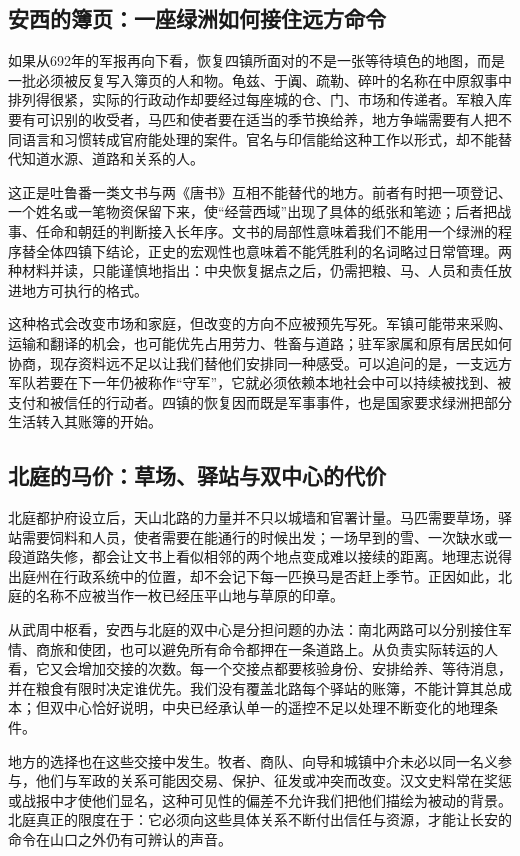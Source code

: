 \subsection{安西的簿页：一座绿洲如何接住远方命令}
如果从692年的军报再向下看，恢复四镇所面对的不是一张等待填色的地图，而是一批必须被反复写入簿页的人和物。龟兹、于阗、疏勒、碎叶的名称在中原叙事中排列得很紧，实际的行政动作却要经过每座城的仓、门、市场和传递者。军粮入库要有可识别的收受者，马匹和使者要在适当的季节换给养，地方争端需要有人把不同语言和习惯转成官府能处理的案件。官名与印信能给这种工作以形式，却不能替代知道水源、道路和关系的人。

这正是吐鲁番一类文书与两《唐书》互相不能替代的地方。前者有时把一项登记、一个姓名或一笔物资保留下来，使“经营西域”出现了具体的纸张和笔迹；后者把战事、任命和朝廷的判断接入长年序。文书的局部性意味着我们不能用一个绿洲的程序替全体四镇下结论，正史的宏观性也意味着不能凭胜利的名词略过日常管理。两种材料并读，只能谨慎地指出：中央恢复据点之后，仍需把粮、马、人员和责任放进地方可执行的格式。

这种格式会改变市场和家庭，但改变的方向不应被预先写死。军镇可能带来采购、运输和翻译的机会，也可能优先占用劳力、牲畜与道路；驻军家属和原有居民如何协商，现存资料远不足以让我们替他们安排同一种感受。可以追问的是，一支远方军队若要在下一年仍被称作“守军”，它就必须依赖本地社会中可以持续被找到、被支付和被信任的行动者。四镇的恢复因而既是军事事件，也是国家要求绿洲把部分生活转入其账簿的开始。

\subsection{北庭的马价：草场、驿站与双中心的代价}
北庭都护府设立后，天山北路的力量并不只以城墙和官署计量。马匹需要草场，驿站需要饲料和人员，使者需要在能通行的时候出发；一场早到的雪、一次缺水或一段道路失修，都会让文书上看似相邻的两个地点变成难以接续的距离。地理志说得出庭州在行政系统中的位置，却不会记下每一匹换马是否赶上季节。正因如此，北庭的名称不应被当作一枚已经压平山地与草原的印章。

从武周中枢看，安西与北庭的双中心是分担问题的办法：南北两路可以分别接住军情、商旅和使团，也可以避免所有命令都押在一条道路上。从负责实际转运的人看，它又会增加交接的次数。每一个交接点都要核验身份、安排给养、等待消息，并在粮食有限时决定谁优先。我们没有覆盖北路每个驿站的账簿，不能计算其总成本；但双中心恰好说明，中央已经承认单一的遥控不足以处理不断变化的地理条件。

地方的选择也在这些交接中发生。牧者、商队、向导和城镇中介未必以同一名义参与，他们与军政的关系可能因交易、保护、征发或冲突而改变。汉文史料常在奖惩或战报中才使他们显名，这种可见性的偏差不允许我们把他们描绘为被动的背景。北庭真正的限度在于：它必须向这些具体关系不断付出信任与资源，才能让长安的命令在山口之外仍有可辨认的声音。

